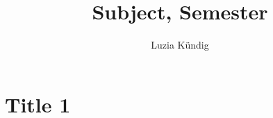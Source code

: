 \documentclass[10pt, a4paper]{article}
\title{Subject, Semester}
\author{Luzia Kündig}
\begin{document}
\maketitle

\section{Title 1}
\end{document}
